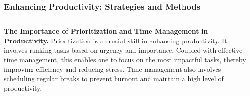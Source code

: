 \documentclass[5pt]{beamer}
\begin{document}
\begin{frame}
\frametitle{Enhancing Productivity: Strategies and Methods}
\begin{columns}
\begin{column}{0.7\textwidth}
\begin{block}{\textbf{The Importance of Prioritization and Time Management in Productivity.}}
Prioritization is a crucial skill in enhancing productivity. It involves ranking tasks based on urgency and importance. Coupled with effective time management, this enables one to focus on the most impactful tasks, thereby improving efficiency and reducing stress. Time management also involves scheduling regular breaks to prevent burnout and maintain a high level of productivity.
\end{block}
\end{column}
\end{columns}
\end{frame}
\end{document}
